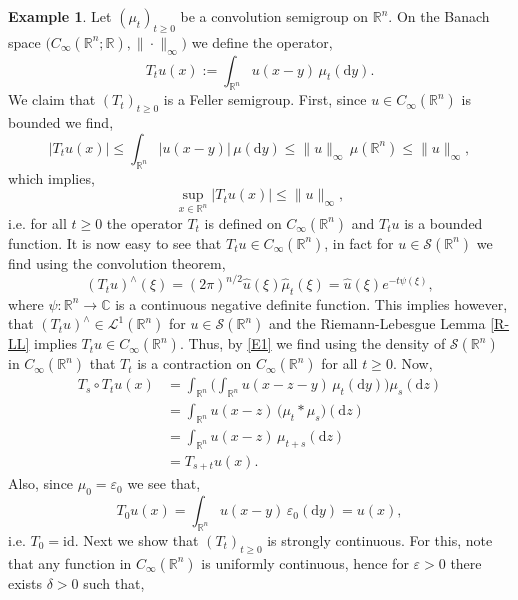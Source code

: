 \documentclass[a4paper, 12pt]{report}
\theoremstyle{cor}
\theoremstyle{remark}
\theoremstyle{definition}
\newtheorem{eg}[theorem]{Example}
\begin{document}
\begin{eg}\label{FTaSOSE1}
Let $(\mu_t)_{t \ge 0}$ be a convolution semigroup on $\mathbb{R}^n$.  On the Banach space $\big(C_\infty(\mathbb{R}^n; \mathbb{R}), \|\cdot\|_\infty\big)$ we define the operator,
\begin{equation}
T_tu(x) := \int_{\mathbb{R}^n}u(x - y)\,\mu_t(\mathrm{d}y).\label{FSO}
\end{equation}
We claim that $(T_t)_{t \ge 0}$ is a Feller semigroup.  First, since $u \in C_\infty(\mathbb{R}^n)$ is bounded we find,
$$
|T_tu(x)| \le \int_{\mathbb{R}^n}|u(x - y)|\,\mu(\mathrm{d}y) \le \|u\|_\infty\,\mu(\mathbb{R}^n) \le \|u\|_\infty,
$$
which implies,
\begin{equation}
\sup_{x \in \mathbb{R}^n}|T_tu(x)| \le \|u\|_\infty,\label{E1}
\end{equation}
i.e. for all $t \ge 0$ the operator $T_t$ is defined on $C_\infty(\mathbb{R}^n)$ and $T_tu$ is a bounded function.  It is now easy to see that $T_tu \in C_\infty(\mathbb{R}^n)$, in fact for $u \in \mathcal{S}(\mathbb{R}^n)$ we find using the convolution theorem,
\begin{equation}
(T_tu)^\wedge(\xi) = (2\pi)^{n/2}\hat{u}(\xi)\hat{\mu}_t(\xi) = \hat{u}(\xi)e^{-t\psi(\xi)},\label{E2}
\end{equation}
where $\psi : \mathbb{R}^n \to \mathbb{C}$ is a continuous negative definite function.  This implies however, that $(T_tu)^\wedge \in \mathcal{L}^1(\mathbb{R}^n)$ for $u \in \mathcal{S}(\mathbb{R}^n)$ and the Riemann-Lebesgue Lemma \eqref{R-LL} implies $T_tu \in C_\infty(\mathbb{R}^n)$.  Thus, by \eqref{E1} we find using the density of $\mathcal{S}(\mathbb{R}^n)$ in $C_\infty(\mathbb{R}^n)$ that $T_t$ is a contraction on $C_\infty(\mathbb{R}^n)$ for all $t \ge 0$.  Now,
$$
\begin{aligned}
T_s \circ T_tu(x) & = \int_{\mathbb{R}^n}\bigg(\int_{\mathbb{R}^n}u(x - z - y)\,\mu_t(\mathrm{d}y)\bigg)\mu_s(\mathrm{d}z)\\
& = \int_{\mathbb{R}^n}u(x - z)\,\big(\mu_t\ast\mu_s\big)(\mathrm{d}z)\\
& = \int_{\mathbb{R}^n}u(x - z)\,\mu_{t + s}(\mathrm{d}z)\\
& = T_{s + t}u(x).
\end{aligned}
$$
Also, since $\mu_0 = \varepsilon_0$ we see that,
$$
T_0u(x) = \int_{\mathbb{R}^n}u(x - y)\,\varepsilon_0(\mathrm{d}y) = u(x),
$$
i.e. $T_0 = \mathrm{id}$.  Next we show that $(T_t)_{t \ge 0}$ is strongly continuous.  For this, note that any function in $C_\infty(\mathbb{R}^n)$ is uniformly continuous, hence for $\varepsilon > 0$ there exists $\delta > 0$ such that,

\end{eg}
\end{document}
